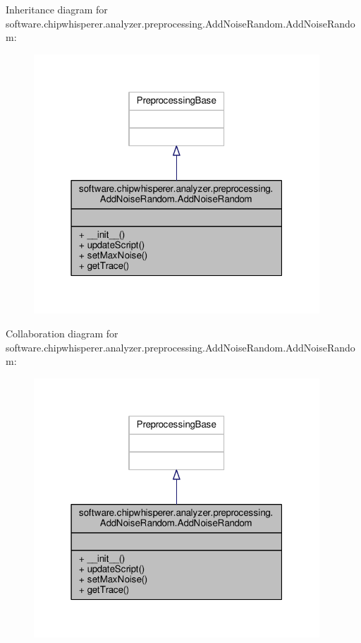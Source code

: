 Inheritance diagram for software.\+chipwhisperer.\+analyzer.\+preprocessing.\+Add\+Noise\+Random.\+Add\+Noise\+Random\+:\nopagebreak
\begin{figure}[H]
\begin{center}
\leavevmode
\includegraphics[width=304pt]{da/d2c/classsoftware_1_1chipwhisperer_1_1analyzer_1_1preprocessing_1_1AddNoiseRandom_1_1AddNoiseRandom__inherit__graph}
\end{center}
\end{figure}


Collaboration diagram for software.\+chipwhisperer.\+analyzer.\+preprocessing.\+Add\+Noise\+Random.\+Add\+Noise\+Random\+:\nopagebreak
\begin{figure}[H]
\begin{center}
\leavevmode
\includegraphics[width=304pt]{de/ddf/classsoftware_1_1chipwhisperer_1_1analyzer_1_1preprocessing_1_1AddNoiseRandom_1_1AddNoiseRandom__coll__graph}
\end{center}
\end{figure}



